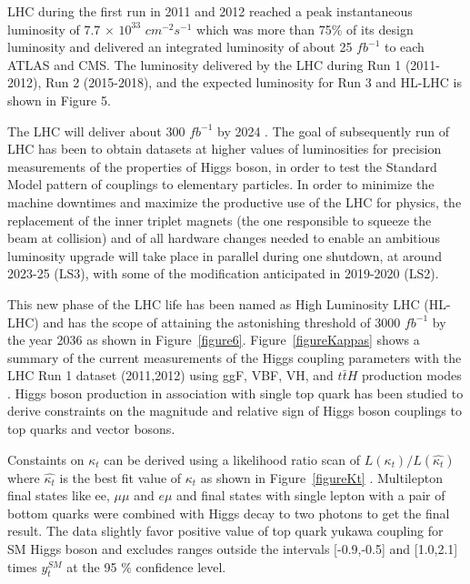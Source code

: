 \documentclass[final,3p]{CSP}
\begin{document}

LHC during the first run in 2011 and 2012 reached a peak instantaneous luminosity of 7.7 $\times$ $10^{33}$ $cm^{-2}s^{-1}$ which was more than 75$\%$ of its design luminosity and delivered an integrated luminosity of about 25 $fb^{-1}$ to each ATLAS and CMS. The luminosity delivered by the LHC during Run 1 (2011-2012),  Run 2 (2015-2018), and the expected luminosity for Run 3 and HL-LHC is shown in Figure 5. 

\clearpage
\iffalse
The LHC will deliver about 300 $fb^{-1}$ by 2024 \cite{collaborations2019report}.
The goal of subsequently run of LHC has been to obtain datasets at higher values of luminosities for precision measurements of the properties of Higgs boson, in order to test the Standard Model pattern of couplings to elementary particles.
In order to minimize the machine downtimes and maximize the productive use of the LHC for physics, the replacement of the inner triplet magnets (the one responsible to squeeze the beam at collision) and  of  all  hardware  changes  needed  to  enable  an  ambitious  luminosity  upgrade  will  take  place in parallel during one shutdown, at around 2023-25 (LS3), with some of the modification anticipated in 2019-2020 (LS2).

This new phase of the LHC life has been named as High Luminosity LHC (HL-LHC) and has the scope of attaining the astonishing threshold of 3000 $fb^{-1}$ by the year 2036 as shown in Figure~\ref{figure6}.
Figure~\ref{figureKappas} shows a summary of the current measurements of the Higgs coupling parameters with the LHC Run 1 dataset (2011,2012)  using ggF, VBF, VH, and ${t\bar{t}H}$ production modes \cite{Tanabashi:2018oca}.
Higgs boson production in association with single top quark has been studied to derive constraints on the magnitude and relative sign of Higgs boson couplings to top quarks and vector bosons.

Constaints on $\kappa_t$ can be derived using a likelihood ratio scan of $L(\kappa_t)/L(\hat{\kappa_t})$ where $\hat{\kappa_t}$ is the best fit value of $\kappa_t$ as shown in Figure~\ref{figureKt} \cite{Sirunyan:2018lzm}.
Multilepton final states like ee, $\mu\mu$ and $e\mu$ and final states with single lepton with a pair of bottom quarks were combined with Higgs decay to two photons to get the final result. The data slightly favor positive value of top quark yukawa coupling for SM Higgs boson and excludes ranges outside the intervals [-0.9,-0.5] and [1.0,2.1] times $y^{SM}_t$ at the 95 $\%$ confidence level.
\end{document}
